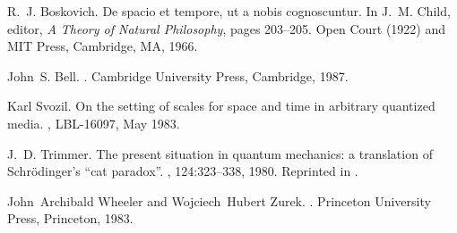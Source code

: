 \begin{thebibliography}{10}
R.~J. Boskovich.
\newblock De spacio et tempore, ut a nobis cognoscuntur.
\newblock In J.~M. Child, editor, {\em A Theory of Natural Philosophy}, pages
  203--205. Open Court (1922) and MIT Press, Cambridge, MA, 1966.

John~S. Bell.
.
\newblock Cambridge University Press, Cambridge, 1987.

Karl Svozil.
\newblock On the setting of scales for space and time in arbitrary quantized
  media.
, LBL-16097, May 1983.

J.~D. Trimmer.
\newblock The present situation in quantum mechanics: a translation of
  {S}chr{\"{o}}dinger's ``cat paradox''.
, 124:323--338, 1980.
\newblock Reprinted in \cite[pp. 152-167]{wheeler-Zurek:83}.

John~Archibald Wheeler and Wojciech~Hubert Zurek.
.
\newblock Princeton University Press, Princeton, 1983.

\end{thebibliography}


